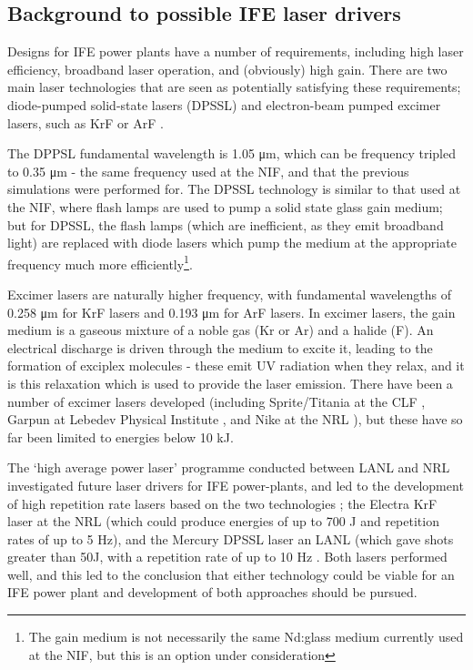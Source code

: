 \subsection{Background to possible IFE laser drivers}

Designs for IFE power plants have a number of requirements, including high laser efficiency, broadband laser operation, and (obviously) high gain. There are two main laser technologies that are seen as potentially satisfying these requirements; diode-pumped solid-state lasers (DPSSL) and electron-beam pumped excimer lasers, such as KrF or ArF \cite{Craxton2015}. 

The DPPSL fundamental wavelength is 1.05 \unit{\micro\meter}, which can be frequency tripled to 0.35 \unit{\micro\meter} - the same frequency used at the NIF, and that the previous simulations were performed for. The DPSSL technology is similar to that used at the NIF, where flash lamps are used to pump a solid state glass gain medium; but for DPSSL, the flash lamps (which are inefficient, as they emit broadband light) are replaced with diode lasers which pump the medium at the appropriate frequency much more efficiently\footnote{The gain medium is not necessarily the same Nd:glass medium currently used at the NIF, but this is an option under consideration}. 

Excimer lasers are naturally higher frequency, with fundamental wavelengths of 0.258 \unit{\micro\meter} for KrF lasers and 0.193 \unit{\micro\meter} for ArF lasers. In excimer lasers, the gain medium is a gaseous mixture of a noble gas (Kr or Ar) and a halide (F). An electrical discharge is driven through the medium to excite it, leading to the formation of exciplex molecules - these emit UV radiation when they relax, and it is this relaxation which is used to provide the laser emission. There have been a number of excimer lasers developed (including Sprite/Titania at the CLF \cite{Divall1996}, Garpun at Lebedev Physical Institute \cite{Zvorykin2006}, and Nike at the NRL \cite{Obenschain1996}), but these have so far been limited to energies below 10 kJ. 

The `high average power laser' programme conducted between LANL and NRL investigated future laser drivers for IFE power-plants, and led to the development of high repetition rate lasers based on the two technologies \cite{Craxton2015}; the Electra KrF laser at the NRL (which could produce energies of up to 700 J and repetition rates of up to 5 Hz), and the Mercury DPSSL laser an LANL (which gave shots greater than 50J, with a repetition rate of up to 10 Hz \cite{Sethian2010}. Both lasers performed well, and this led to the conclusion that either technology could be viable for an IFE power plant and development of both approaches should be pursued.

